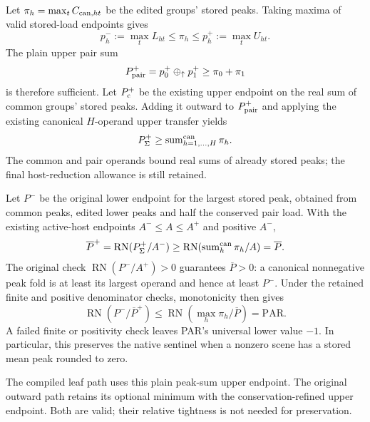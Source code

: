\documentclass[11pt]{article}
\begin{document}
Let $\pi_h=\max_tC_{{\rm can},ht}$ be the edited groups' stored peaks. Taking maxima of valid stored-load endpoints gives
\begin{equation}
p_h^-:=\max_tL_{ht}\le\pi_h\le p_h^+:=\max_tU_{ht}.
\end{equation}
The plain upper pair sum
\begin{equation}
P_{\rm pair}^+=p_0^+\oplus_\uparrow p_1^+\ge\pi_0+\pi_1
\label{eq:uniform-pair-peak}
\end{equation}
is therefore sufficient. Let $P_{\rm c}^+$ be the existing upper endpoint on the real sum of common groups' stored peaks. Adding it outward to $P_{\rm pair}^+$ and applying the existing canonical $H$-operand upper transfer yields
\begin{equation}
P_\Sigma^+\ge\operatorname{sum}^{\rm can}_{h=1,\ldots,H}\pi_h.
\label{eq:uniform-peak-fold}
\end{equation}
The common and pair operands bound real sums of already stored peaks; the final host-reduction allowance is still retained.

Let $P^-$ be the original lower endpoint for the largest stored peak, obtained from common peaks, edited lower peaks and half the conserved pair load. With the existing active-host endpoints $A^-\le A\le A^+$ and positive $A^-$,
\begin{equation}
\overline P^+=\operatorname{RN}(P_\Sigma^+/A^-)
\ge\operatorname{RN}\!\left(\operatorname{sum}^{\rm can}_h\pi_h/A\right)
=\overline P.
\end{equation}
The original check $\operatorname{RN}(P^-/A^+)>0$ guarantees $\overline P>0$: a canonical nonnegative peak fold is at least its largest operand and hence at least $P^-$. Under the retained finite and positive denominator checks, monotonicity then gives
\begin{equation}
\operatorname{RN}(P^-/\overline P^+)
\le\operatorname{RN}\!\left(\max_h\pi_h/\overline P\right)
=\mathrm{PAR}.
\label{eq:uniform-par}
\end{equation}
A failed finite or positivity check leaves PAR's universal lower value $-1$. In particular, this preserves the native sentinel when a nonzero scene has a stored mean peak rounded to zero.

The compiled leaf path uses this plain peak-sum upper endpoint. The original outward path retains its optional minimum with the conservation-refined upper endpoint. Both are valid; their relative tightness is not needed for preservation.
\end{document}
